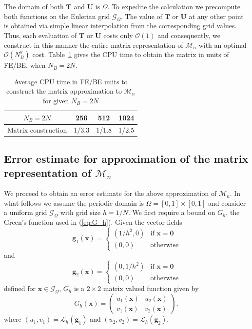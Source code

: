 \documentclass[preprint,12pt]{elsarticle}
\begin{document}
The domain of both $\mathbf{T}$ and $\mathbf{U}$ is $\Omega$. To expedite the calculation we precompute both functions on the Eulerian grid $\mathcal{G}_\Omega$. The value of $\mathbf{T}$ or $\mathbf{U}$ at any other point is obtained via simple linear
interpolation from the corresponding grid values. Thus, each evaluation of $\mathbf{T}$ or $\mathbf{U}$  costs only $\mathcal{O}(1)$  and consequently, we construct in 
this manner  the entire matrix representation of $\mathcal{M}_n$ with an optimal $\mathcal{O}(N_B^2)$ cost.
Table~\ref{Table:MConstruct} gives the CPU time to obtain the matrix in units of FE/BE, when $N_B=2N$. 
\begin{table}
\begin{center}
\begin{tabular}{|c|c c c|}
\hline
$N_B=2N$ &  256  & 512 & 1024 \\
\hline
\textrm{Matrix construction} 
& 1/3.3  & 1/1.8 &  1/2.5 \\
\hline
\end{tabular}
\end{center}
\caption{Average CPU time in FE/BE units to construct the matrix approximation to $\mathcal{M}_n$ for given $N_B=2N$}
\label{Table:MConstruct}
\end{table}

\subsection{Error estimate for approximation of the matrix representation of $\mathcal{M}_n$}
We proceed to obtain an error estimate for the above approximation of $\mathcal{M}_n$. In what follows we assume the periodic domain is $\Omega = [0,1]\times[0,1]$ and consider a uniform grid $\mathcal{G}_\Omega$ with grid size $h=1/N$.
We first require a bound on $G_h$, the Green's function used in (\ref{eq:G_h}). Given the vector fields
\begin{equation}
\mathbf{g}_1(\mathbf{x}) = \begin{cases}
(1/h^2,0)& \textrm{if } \mathbf{x} = \mathbf{0} \\
(0,0)& \textrm{otherwise}
\end{cases}
\end{equation}
and
\begin{equation}
\mathbf{g}_2(\mathbf{x}) = \begin{cases}
(0,1/h^2)& \textrm{if } \mathbf{x} = \mathbf{0} \\
(0,0)& \textrm{otherwise}
\end{cases}
\end{equation}
defined for $\mathbf{x} \in \mathcal{G}_\Omega$, 
$G_h$ is a $2\times 2$ matrix valued function given by
\begin{equation}
G_h(\mathbf{x})=
\left( \begin{array}{cc}
u_1(\mathbf{x}) & u_2(\mathbf{x}) \\
v_1(\mathbf{x}) & v_2(\mathbf{x})
\end{array} \right),\label{eq:G_h}
\end{equation}
where $(u_1,v_1) = \mathcal{L}_h(\mathbf{g}_1)$ and $(u_2,v_2) = \mathcal{L}_h(\mathbf{g}_2)$.
\end{document}
